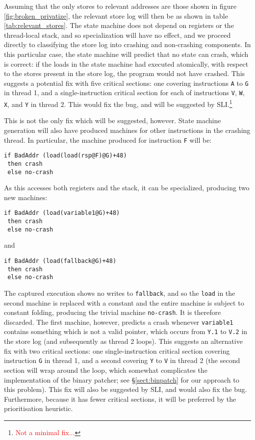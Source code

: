 \documentclass[10pt,twocolumn,preprint,natbib,authoryear]{sigplanconf}
\newcommand{\editorial}[1]{\textcolor{red}{\footnote{\textcolor{red}{#1}}}}
\begin{document}
Assuming that the only stores to relevant addresses are those shown in
figure \ref{fig:broken_privatize}, the relevant store log will then be
as shown in table \ref{tab:relevant_stores}.  The state machine does
not depend on registers or the thread-local stack, and so
specialization will have no effect, and we proceed directly to
classifying the store log into crashing and non-crashing components.
In this particular case, the state machine will predict that no state
can crash, which is correct: if the loads in the state machine had
executed atomically, with respect to the stores present in the store
log, the program would not have crashed.  This suggests a potential
fix with five critical sections: one covering instructions \verb|A| to
\verb|G| in thread 1, and a single-instruction critical section for
each of instructions \verb|V|, \verb|W|, \verb|X|, and \verb|Y| in
thread 2.  This would fix the bug, and will be suggested by
SLI.\editorial{Not a minimal fix...}

This is not the only fix which will be suggested, however.  State
machine generation will also have produced machines for other
instructions in the crashing thread.  In particular, the machine
produced for instruction \verb|F| will be:

\begin{verbatim}
if BadAddr (load(load(rsp@F)@G)+48)
 then crash
 else no-crash
\end{verbatim}

\noindent
As this accesses both registers and the stack, it can be specialized,
producing two new machines:

\begin{verbatim}
if BadAddr (load(variable1@G)+48)
 then crash
 else no-crash
\end{verbatim}

and

\begin{verbatim}
if BadAddr (load(fallback@G)+48)
 then crash
 else no-crash
\end{verbatim}

\noindent
The captured execution shows no writes to \verb|fallback|, and so the
\verb|load| in the second machine is replaced with a constant and the
entire machine is subject to constant folding, producing the trivial
machine \verb|no-crash|.  It is therefore discarded.  The first
machine, however, predicts a crash whenever \verb|variable1| contains
something which is not a valid pointer, which occurs from \verb|Y.1|
to \verb|V.2| in the store log (and subsequently as thread 2 loops).
This suggests an alternative fix with two critical sections: one
single-instruction critical section covering instruction \verb|G| in
thread 1, and a second covering \verb|Y| to \verb|V| in thread 2 (the
second section will wrap around the loop, which somewhat complicates
the implementation of the binary patcher; see \S\ref{sect:binpatch}
for our approach to this problem).  This fix will also be suggested by
SLI, and would also fix the bug.  Furthermore, because it has fewer
critical sections, it will be preferred by the prioritisation
heuristic.
\end{document}
